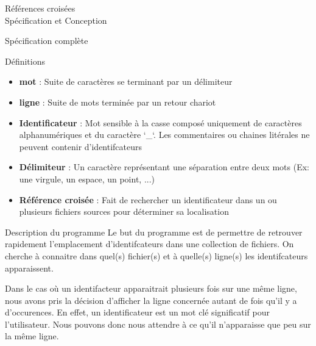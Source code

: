\documentclass{article}
\begin{document}
\begin{center} 
\Huge{Références croisées \\ Spécification et Conception}
\end{center}



\begin{section}{Spécification complète}


  \begin{subsection}{Définitions}

    \begin{itemize}

      \item \textbf{mot} : Suite de caractères se terminant par un délimiteur

      \item \textbf{ligne} : Suite de mots terminée par un retour chariot

      \item \textbf{Identificateur} : Mot sensible à la casse composé uniquement de caractères alphanumériques et du caractère `\_`. 
				      Les commentaires ou chaines litérales ne peuvent contenir d'identifcateurs

      \item \textbf{Délimiteur} : Un caractère représentant une séparation entre deux mots (Ex: une virgule, un espace, un point, ...) 

      \item \textbf{Référence croisée} : Fait de rechercher un identificateur dans un ou plusieurs fichiers sources pour déterminer sa localisation
    \end{itemize}

  \end{subsection}


  \begin{subsection}{Description du programme}
    Le but du programme est de permettre de retrouver rapidement l'emplacement d'identifcateurs dans une collection de fichiers.
    On cherche à connaitre dans quel(s) fichier(s) et à quelle(s) ligne(s) les identifcateurs apparaissent.
    
    Dans le cas où un identifacteur apparaitrait plusieurs fois sur une même ligne, nous avons pris la décision d'afficher
    la ligne concernée autant de fois qu'il y a d'occurences. En effet, un identificateur est un mot clé significatif pour l'utilisateur.
    Nous pouvons donc nous attendre à ce qu'il n'apparaisse que peu sur la même ligne.
    

\end{subsection}
\end{section}
\end{document}
